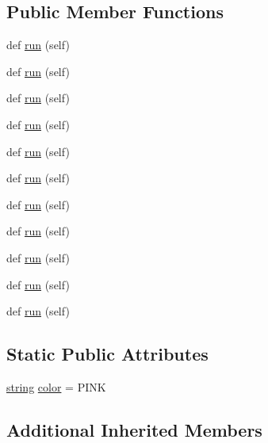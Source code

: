 \subsection*{Public Member Functions}
\begin{DoxyCompactItemize}
\item 
def \hyperlink{classwaflib_1_1_tools_1_1c__osx_1_1macapp_ae39c2904110e53557abf9cb4a798e20a}{run} (self)
\item 
def \hyperlink{classwaflib_1_1_tools_1_1c__osx_1_1macapp_ae39c2904110e53557abf9cb4a798e20a}{run} (self)
\item 
def \hyperlink{classwaflib_1_1_tools_1_1c__osx_1_1macapp_ae39c2904110e53557abf9cb4a798e20a}{run} (self)
\item 
def \hyperlink{classwaflib_1_1_tools_1_1c__osx_1_1macapp_ae39c2904110e53557abf9cb4a798e20a}{run} (self)
\item 
def \hyperlink{classwaflib_1_1_tools_1_1c__osx_1_1macapp_ae39c2904110e53557abf9cb4a798e20a}{run} (self)
\item 
def \hyperlink{classwaflib_1_1_tools_1_1c__osx_1_1macapp_ae39c2904110e53557abf9cb4a798e20a}{run} (self)
\item 
def \hyperlink{classwaflib_1_1_tools_1_1c__osx_1_1macapp_ae39c2904110e53557abf9cb4a798e20a}{run} (self)
\item 
def \hyperlink{classwaflib_1_1_tools_1_1c__osx_1_1macapp_ae39c2904110e53557abf9cb4a798e20a}{run} (self)
\item 
def \hyperlink{classwaflib_1_1_tools_1_1c__osx_1_1macapp_ae39c2904110e53557abf9cb4a798e20a}{run} (self)
\item 
def \hyperlink{classwaflib_1_1_tools_1_1c__osx_1_1macapp_ae39c2904110e53557abf9cb4a798e20a}{run} (self)
\item 
def \hyperlink{classwaflib_1_1_tools_1_1c__osx_1_1macapp_ae39c2904110e53557abf9cb4a798e20a}{run} (self)
\end{DoxyCompactItemize}
\subsection*{Static Public Attributes}
\begin{DoxyCompactItemize}
\item 
\hyperlink{test__lib_f_l_a_c_2format_8c_ab02026ad0de9fb6c1b4233deb0a00c75}{string} \hyperlink{classwaflib_1_1_tools_1_1c__osx_1_1macapp_af0b3eade8cf4f9d67946889c4bda83f3}{color} = \textquotesingle{}P\+I\+NK\textquotesingle{}
\end{DoxyCompactItemize}
\subsection*{Additional Inherited Members}


